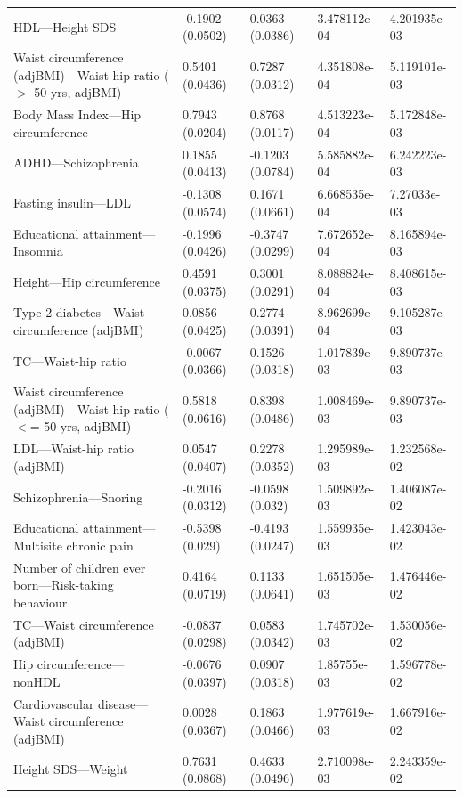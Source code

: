 \begin{table}[ht]
\begin{tabular}{lllll}
  HDL---Height SDS & -0.1902 (0.0502) & 0.0363 (0.0386) & 3.478112e-04 & 4.201935e-03 \\ 
  Waist circumference (adjBMI)---Waist-hip ratio ($>$ 50 yrs, adjBMI) & 0.5401 (0.0436) & 0.7287 (0.0312) & 4.351808e-04 & 5.119101e-03 \\ 
  Body Mass Index---Hip circumference & 0.7943 (0.0204) & 0.8768 (0.0117) & 4.513223e-04 & 5.172848e-03 \\ 
  ADHD---Schizophrenia & 0.1855 (0.0413) & -0.1203 (0.0784) & 5.585882e-04 & 6.242223e-03 \\ 
  Fasting insulin---LDL & -0.1308 (0.0574) & 0.1671 (0.0661) & 6.668535e-04 & 7.27033e-03 \\ 
  Educational attainment---Insomnia & -0.1996 (0.0426) & -0.3747 (0.0299) & 7.672652e-04 & 8.165894e-03 \\ 
  Height---Hip circumference & 0.4591 (0.0375) & 0.3001 (0.0291) & 8.088824e-04 & 8.408615e-03 \\ 
  Type 2 diabetes---Waist circumference (adjBMI) & 0.0856 (0.0425) & 0.2774 (0.0391) & 8.962699e-04 & 9.105287e-03 \\ 
  TC---Waist-hip ratio & -0.0067 (0.0366) & 0.1526 (0.0318) & 1.017839e-03 & 9.890737e-03 \\ 
  Waist circumference (adjBMI)---Waist-hip ratio ($<$= 50 yrs, adjBMI) & 0.5818 (0.0616) & 0.8398 (0.0486) & 1.008469e-03 & 9.890737e-03 \\ 
  LDL---Waist-hip ratio (adjBMI) & 0.0547 (0.0407) & 0.2278 (0.0352) & 1.295989e-03 & 1.232568e-02 \\ 
  Schizophrenia---Snoring & -0.2016 (0.0312) & -0.0598 (0.032) & 1.509892e-03 & 1.406087e-02 \\ 
  Educational attainment---Multisite chronic pain & -0.5398 (0.029) & -0.4193 (0.0247) & 1.559935e-03 & 1.423043e-02 \\ 
  Number of children ever born---Risk-taking behaviour & 0.4164 (0.0719) & 0.1133 (0.0641) & 1.651505e-03 & 1.476446e-02 \\ 
  TC---Waist circumference (adjBMI) & -0.0837 (0.0298) & 0.0583 (0.0342) & 1.745702e-03 & 1.530056e-02 \\ 
  Hip circumference---nonHDL & -0.0676 (0.0397) & 0.0907 (0.0318) & 1.85755e-03 & 1.596778e-02 \\ 
  Cardiovascular disease---Waist circumference (adjBMI) & 0.0028 (0.0367) & 0.1863 (0.0466) & 1.977619e-03 & 1.667916e-02 \\ 
  Height SDS---Weight & 0.7631 (0.0868) & 0.4633 (0.0496) & 2.710098e-03 & 2.243359e-02 \\ 

\end{tabular}
\end{table}
